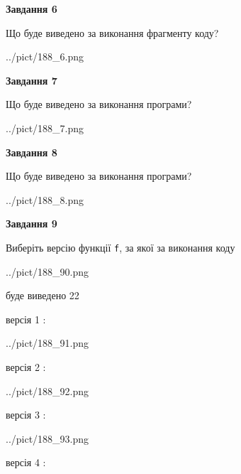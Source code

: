 \documentclass[12pt, ukrainian]{article}
\def\code#1{\Verb!#1!}
\begin{document}
{\begin {large}
{\begin {center}\textbf{Завдання 6}\end {center}}

Що буде виведено за виконання фрагменту коду?\par
\begin{center}
	{../pict/188_6.png}
\end{center}
\newpage

{\begin {center}\textbf{Завдання 7}\end {center}}

Що буде виведено за виконання програми?\par
\begin{center}
	{../pict/188_7.png}
\end{center}
\newpage

{\begin {center}\textbf{Завдання 8}\end {center}}

Що буде виведено за виконання програми?\par
\begin{center}
	{../pict/188_8.png}
\end{center}
\newpage

{\begin {center}\textbf{Завдання 9}\end {center}}

Виберіть версію функції \code{f}, за якої за виконання коду
\begin{center}
	{../pict/188_90.png}
\end{center}
буде виведено 22

\vspace{5mm}
версія 1 :

\begin{center}
	{../pict/188_91.png}
\end{center}
версія 2 :

\begin{center}
	{../pict/188_92.png}
\end{center}
версія 3 :

\begin{center}
	{../pict/188_93.png}
\end{center}
версія 4 :


\end{large}}
\end{document}
